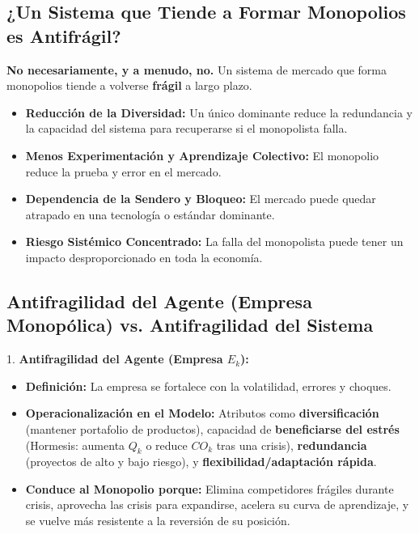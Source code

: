 \documentclass{article}
\begin{document}
\subsection{¿Un Sistema que Tiende a Formar Monopolios es Antifrágil?}
\textbf{No necesariamente, y a menudo, no.} Un sistema de mercado que forma monopolios tiende a volverse \textbf{frágil} a largo plazo.
\begin{itemize}
    \item \textbf{Reducción de la Diversidad:} Un único dominante reduce la redundancia y la capacidad del sistema para recuperarse si el monopolista falla.
    \item \textbf{Menos Experimentación y Aprendizaje Colectivo:} El monopolio reduce la prueba y error en el mercado.
    \item \textbf{Dependencia de la Sendero y Bloqueo:} El mercado puede quedar atrapado en una tecnología o estándar dominante.
    \item \textbf{Riesgo Sistémico Concentrado:} La falla del monopolista puede tener un impacto desproporcionado en toda la economía.
\end{itemize}

\subsection{Antifragilidad del Agente (Empresa Monopólica) vs. Antifragilidad del Sistema}

1.  \textbf{Antifragilidad del Agente (Empresa $E_k$):}
    \begin{itemize}
        \item \textbf{Definición:} La empresa se fortalece con la volatilidad, errores y choques.
        \item \textbf{Operacionalización en el Modelo:} Atributos como \textbf{diversificación} (mantener portafolio de productos), capacidad de \textbf{beneficiarse del estrés} (Hormesis: aumenta $Q_k$ o reduce $CO_k$ tras una crisis), \textbf{redundancia} (proyectos de alto y bajo riesgo), y \textbf{flexibilidad/adaptación rápida}.
        \item \textbf{Conduce al Monopolio porque:} Elimina competidores frágiles durante crisis, aprovecha las crisis para expandirse, acelera su curva de aprendizaje, y se vuelve más resistente a la reversión de su posición.
    \end{itemize}
\end{document}
